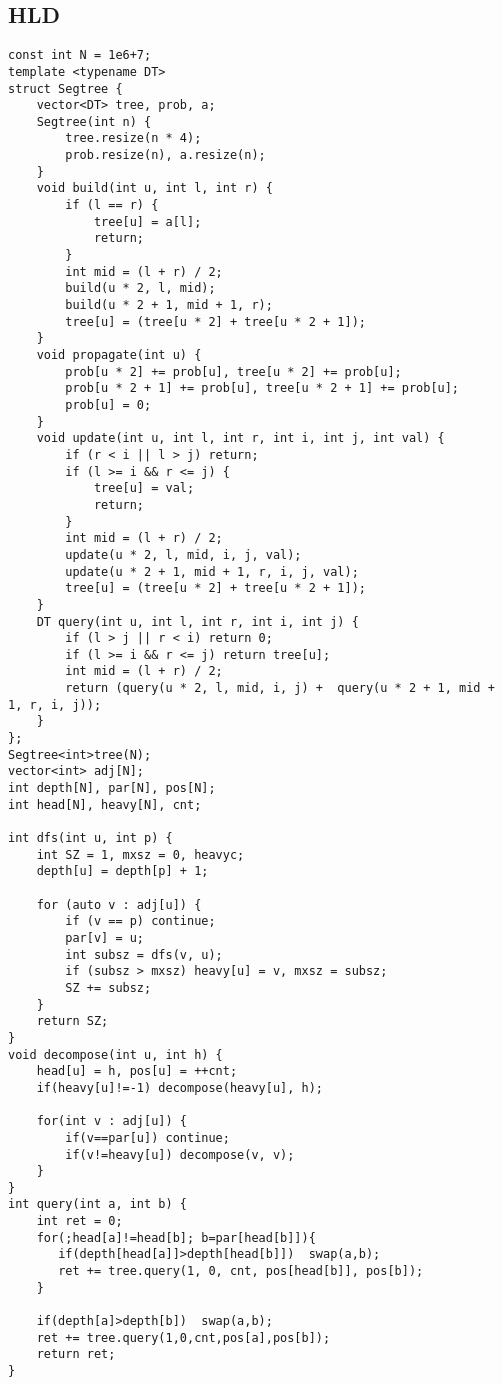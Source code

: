 \documentclass[FSZ,a4paper,onesided]{article}
\begin{document}
\begin{multicols*}{\COLS}
\subsection{HLD}
\begin{lstlisting}
const int N = 1e6+7;
template <typename DT>
struct Segtree {
    vector<DT> tree, prob, a;
    Segtree(int n) {
        tree.resize(n * 4);
        prob.resize(n), a.resize(n);
    }
    void build(int u, int l, int r) {
        if (l == r) {
            tree[u] = a[l];
            return;
        }
        int mid = (l + r) / 2;
        build(u * 2, l, mid);
        build(u * 2 + 1, mid + 1, r);
        tree[u] = (tree[u * 2] + tree[u * 2 + 1]);
    }
    void propagate(int u) {
        prob[u * 2] += prob[u], tree[u * 2] += prob[u];
        prob[u * 2 + 1] += prob[u], tree[u * 2 + 1] += prob[u];
        prob[u] = 0;
    }
    void update(int u, int l, int r, int i, int j, int val) {
        if (r < i || l > j) return;
        if (l >= i && r <= j) {
            tree[u] = val;
            return;
        }
        int mid = (l + r) / 2;
        update(u * 2, l, mid, i, j, val);
        update(u * 2 + 1, mid + 1, r, i, j, val);
        tree[u] = (tree[u * 2] + tree[u * 2 + 1]);
    }
    DT query(int u, int l, int r, int i, int j) {
        if (l > j || r < i) return 0;
        if (l >= i && r <= j) return tree[u];
        int mid = (l + r) / 2;
        return (query(u * 2, l, mid, i, j) +  query(u * 2 + 1, mid + 1, r, i, j));
    }
};
Segtree<int>tree(N);
vector<int> adj[N];
int depth[N], par[N], pos[N];
int head[N], heavy[N], cnt;

int dfs(int u, int p) {
    int SZ = 1, mxsz = 0, heavyc;
    depth[u] = depth[p] + 1;

    for (auto v : adj[u]) {
        if (v == p) continue;
        par[v] = u;
        int subsz = dfs(v, u);
        if (subsz > mxsz) heavy[u] = v, mxsz = subsz;
        SZ += subsz;
    }
    return SZ;
}
void decompose(int u, int h) {
    head[u] = h, pos[u] = ++cnt;
    if(heavy[u]!=-1) decompose(heavy[u], h);

    for(int v : adj[u]) {
        if(v==par[u]) continue;
        if(v!=heavy[u]) decompose(v, v);
    }
}
int query(int a, int b) {
    int ret = 0;
    for(;head[a]!=head[b]; b=par[head[b]]){
       if(depth[head[a]]>depth[head[b]])  swap(a,b);
       ret += tree.query(1, 0, cnt, pos[head[b]], pos[b]);
    }

    if(depth[a]>depth[b])  swap(a,b);
    ret += tree.query(1,0,cnt,pos[a],pos[b]);
    return ret;
}\end{lstlisting}

\end{multicols*}
\end{document}
